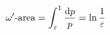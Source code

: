 \documentclass[preview]{standalone}
\begin{document}
\begin{align*}
\special{dvisvgm:raw <g id='unique000'>}\omega'\text{-area}=\int_\varepsilon^1\frac{\mathrm{d}p}{p}=\ln\frac1\varepsilon\special{dvisvgm:raw </g>}
\end{align*}
\end{document}
